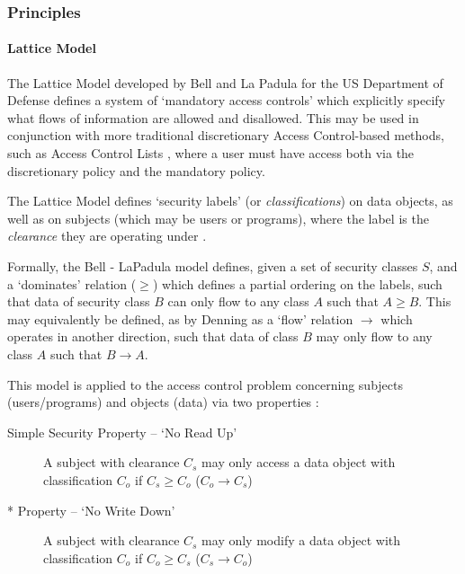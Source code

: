 \pagebreak

\subsubsection{Principles}

	\paragraph{Lattice Model}
	
	The Lattice Model developed by Bell and La Padula for the US Department of Defense \cite{bell1976lattice} defines a system of `mandatory access controls' which explicitly specify what flows of information are allowed and disallowed. This may be used in conjunction with more traditional discretionary Access Control-based methods, such as Access Control Lists \cite{sandhu1993lattice}, where a user must have access both via the discretionary policy and the mandatory policy.
	
	The Lattice Model defines `security labels' (or \textit{classifications}) on data objects, as well as on subjects (which may be users or programs), where the label is the \textit{clearance} they are operating under \cite{denning1976lattice}.
	
	Formally, the Bell - LaPadula model defines, given a set of security classes $ S $, and a `dominates' relation ($ \ge $) \cite{sandhu1993lattice} which defines a partial ordering on the labels, such that data of security class $ B $ can only flow to any class $ A $ such that $ A \ge B $. This may equivalently be defined, as by Denning \cite{denning1976lattice} as a `flow' relation $ \rightarrow $ which operates in another direction, such that data of class $ B $ may only flow to any class $ A $ such that $ B \rightarrow A $.
	
	This model is applied to the access control problem concerning subjects (users/programs) and objects (data) via two properties \cite{bell1973lattice}:
	
	\begin{description}
		\item[Simple Security Property -- `No Read Up'] A subject with clearance $ C_s $ may only access a data object with classification $ C_o $ if $ C_s \ge C_o $ ($ C_o \rightarrow C_s $)
		\item[* Property -- `No Write Down'] A subject with clearance $ C_s $ may only modify a data object with classification $ C_o $ if $ C_o \ge C_s $ ($ C_s \rightarrow C_o $)
	\end{description}
	
